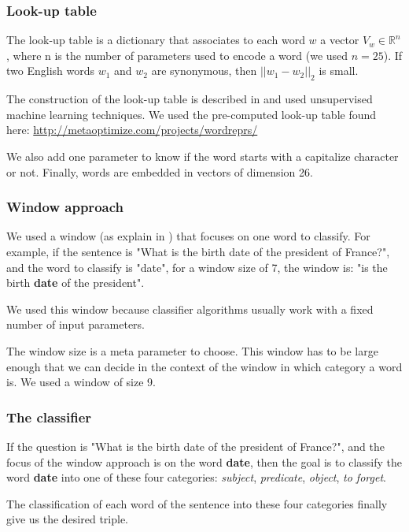 \subsubsection{Look-up table}

The look-up table is a dictionary that associates to each word $w$ a vector $V_w \in \mathbb{R}^n$, where n is the number of parameters used to encode a word (we used $n=25$).
If two English words $w_1$ and $w_2$ are synonymous, then $||w_1-w_2||_2$ is small.

The construction of the look-up table is described in \cite{collobert} and used unsupervised machine learning techniques.
We used the pre-computed look-up table found here: \url{http://metaoptimize.com/projects/wordreprs/}

We also add one parameter to know if the word starts with a capitalize character or not. Finally, words are embedded in vectors of dimension 26. 

\subsubsection{Window approach}

We used a window (as explain in \cite{collobert}) that focuses on one word to classify. For example, if the sentence is "What is the birth date of the president of France?", and the word to classify is "date", for a window size of 7, the window is: "is the birth \textbf{date} of the president".


We used this window because classifier algorithms usually work with a fixed number of input parameters. 

The window size is a meta parameter to choose. This window has to be large enough that we can decide in the context of the window in which category a word is. We used a window of size 9.

\subsubsection{The classifier}

If the question is "What is the birth date of the president of France?", and the focus of the window approach is on the word \textbf{date}, then the goal is to classify the word \textbf{date} into one of these four categories: \textit{subject}, \textit{predicate}, \textit{object}, \textit{to forget}.

The classification of each word of the sentence into these four categories finally give us the desired triple.


